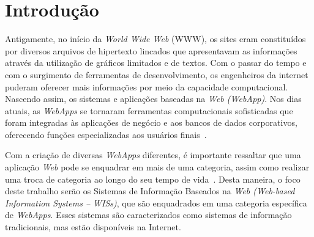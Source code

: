 \chapter{Introdução}
\label{sec-intro}


Antigamente, no início da \textit{World Wide Web} (WWW), os sites eram constituídos por diversos arquivos de hipertexto lincados que apresentavam as informações através da utilização de gráficos limitados e de textos. Com o passar do tempo e com o surgimento de ferramentas de desenvolvimento, os engenheiros da internet puderam oferecer mais informações por meio da capacidade computacional. Nascendo assim, os sistemas e aplicações baseadas na \textit{Web (WebApp)}. Nos dias atuais, as \textit{WebApps} se tornaram ferramentas computacionais sofisticadas que foram integradas às aplicações de negócio e aos bancos de dados corporativos, oferecendo funções especializadas aos usuários finais~\cite{pressman:es11}.    

Com a criação de diversas \textit{WebApps} diferentes, é importante ressaltar que uma aplicação \textit{Web} pode se enquadrar em mais de uma categoria, assim como realizar uma troca de categoria ao longo do seu tempo de vida~\cite{beder:ew12}. Desta maneira, o foco deste trabalho serão os Sistemas de Informação Baseados na \textit{Web (Web-based Information Systems – WISs)}, que são enquadrados em uma categoria específica de \textit{WebApps}. Esses sistemas são caracterizados como sistemas de informação tradicionais, mas estão disponíveis na Internet.


